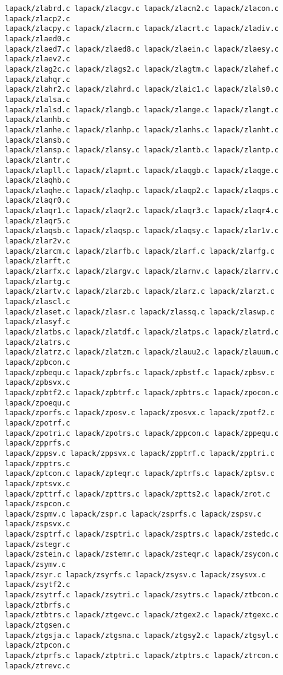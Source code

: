 \documentclass[10pt,a4paper]{article}
\begin{document}
\begin{codeparchment}
\begin{lstlisting}
lapack/zlabrd.c lapack/zlacgv.c lapack/zlacn2.c lapack/zlacon.c lapack/zlacp2.c
lapack/zlacpy.c lapack/zlacrm.c lapack/zlacrt.c lapack/zladiv.c lapack/zlaed0.c
lapack/zlaed7.c lapack/zlaed8.c lapack/zlaein.c lapack/zlaesy.c lapack/zlaev2.c
lapack/zlag2c.c lapack/zlags2.c lapack/zlagtm.c lapack/zlahef.c lapack/zlahqr.c
lapack/zlahr2.c lapack/zlahrd.c lapack/zlaic1.c lapack/zlals0.c lapack/zlalsa.c
lapack/zlalsd.c lapack/zlangb.c lapack/zlange.c lapack/zlangt.c lapack/zlanhb.c
lapack/zlanhe.c lapack/zlanhp.c lapack/zlanhs.c lapack/zlanht.c lapack/zlansb.c
lapack/zlansp.c lapack/zlansy.c lapack/zlantb.c lapack/zlantp.c lapack/zlantr.c
lapack/zlapll.c lapack/zlapmt.c lapack/zlaqgb.c lapack/zlaqge.c lapack/zlaqhb.c
lapack/zlaqhe.c lapack/zlaqhp.c lapack/zlaqp2.c lapack/zlaqps.c lapack/zlaqr0.c
lapack/zlaqr1.c lapack/zlaqr2.c lapack/zlaqr3.c lapack/zlaqr4.c lapack/zlaqr5.c
lapack/zlaqsb.c lapack/zlaqsp.c lapack/zlaqsy.c lapack/zlar1v.c lapack/zlar2v.c
lapack/zlarcm.c lapack/zlarfb.c lapack/zlarf.c lapack/zlarfg.c lapack/zlarft.c
lapack/zlarfx.c lapack/zlargv.c lapack/zlarnv.c lapack/zlarrv.c lapack/zlartg.c
lapack/zlartv.c lapack/zlarzb.c lapack/zlarz.c lapack/zlarzt.c lapack/zlascl.c
lapack/zlaset.c lapack/zlasr.c lapack/zlassq.c lapack/zlaswp.c lapack/zlasyf.c
lapack/zlatbs.c lapack/zlatdf.c lapack/zlatps.c lapack/zlatrd.c lapack/zlatrs.c
lapack/zlatrz.c lapack/zlatzm.c lapack/zlauu2.c lapack/zlauum.c lapack/zpbcon.c
lapack/zpbequ.c lapack/zpbrfs.c lapack/zpbstf.c lapack/zpbsv.c lapack/zpbsvx.c
lapack/zpbtf2.c lapack/zpbtrf.c lapack/zpbtrs.c lapack/zpocon.c lapack/zpoequ.c
lapack/zporfs.c lapack/zposv.c lapack/zposvx.c lapack/zpotf2.c lapack/zpotrf.c
lapack/zpotri.c lapack/zpotrs.c lapack/zppcon.c lapack/zppequ.c lapack/zpprfs.c
lapack/zppsv.c lapack/zppsvx.c lapack/zpptrf.c lapack/zpptri.c lapack/zpptrs.c
lapack/zptcon.c lapack/zpteqr.c lapack/zptrfs.c lapack/zptsv.c lapack/zptsvx.c
lapack/zpttrf.c lapack/zpttrs.c lapack/zptts2.c lapack/zrot.c lapack/zspcon.c
lapack/zspmv.c lapack/zspr.c lapack/zsprfs.c lapack/zspsv.c lapack/zspsvx.c
lapack/zsptrf.c lapack/zsptri.c lapack/zsptrs.c lapack/zstedc.c lapack/zstegr.c
lapack/zstein.c lapack/zstemr.c lapack/zsteqr.c lapack/zsycon.c lapack/zsymv.c
lapack/zsyr.c lapack/zsyrfs.c lapack/zsysv.c lapack/zsysvx.c lapack/zsytf2.c
lapack/zsytrf.c lapack/zsytri.c lapack/zsytrs.c lapack/ztbcon.c lapack/ztbrfs.c
lapack/ztbtrs.c lapack/ztgevc.c lapack/ztgex2.c lapack/ztgexc.c lapack/ztgsen.c
lapack/ztgsja.c lapack/ztgsna.c lapack/ztgsy2.c lapack/ztgsyl.c lapack/ztpcon.c
lapack/ztprfs.c lapack/ztptri.c lapack/ztptrs.c lapack/ztrcon.c lapack/ztrevc.c

\end{lstlisting}
\end{codeparchment}
\end{document}
